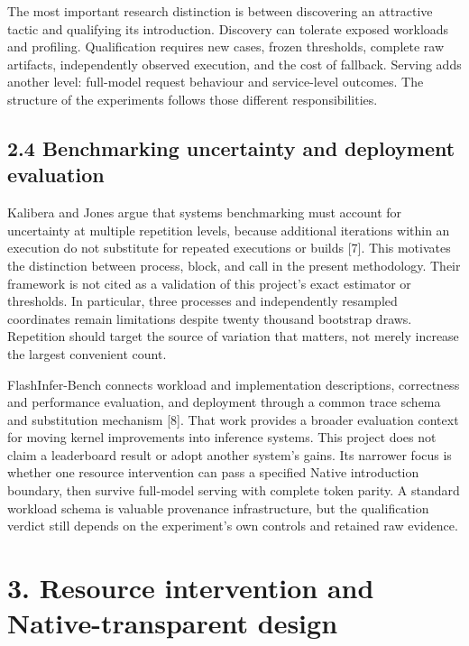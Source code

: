 \documentclass[11pt,a4paper]{article}
\begin{document}
The most important research distinction is between discovering an attractive tactic and qualifying its introduction. Discovery can tolerate exposed workloads and profiling. Qualification requires new cases, frozen thresholds, complete raw artifacts, independently observed execution, and the cost of fallback. Serving adds another level: full-model request behaviour and service-level outcomes. The structure of the experiments follows those different responsibilities.


\subsection*{2.4 Benchmarking uncertainty and deployment evaluation}

Kalibera and Jones argue that systems benchmarking must account for uncertainty at multiple repetition levels, because additional iterations within an execution do not substitute for repeated executions or builds [7]. This motivates the distinction between process, block, and call in the present methodology. Their framework is not cited as a validation of this project's exact estimator or thresholds. In particular, three processes and independently resampled coordinates remain limitations despite twenty thousand bootstrap draws. Repetition should target the source of variation that matters, not merely increase the largest convenient count.


FlashInfer-Bench connects workload and implementation descriptions, correctness and performance evaluation, and deployment through a common trace schema and substitution mechanism [8]. That work provides a broader evaluation context for moving kernel improvements into inference systems. This project does not claim a leaderboard result or adopt another system's gains. Its narrower focus is whether one resource intervention can pass a specified Native introduction boundary, then survive full-model serving with complete token parity. A standard workload schema is valuable provenance infrastructure, but the qualification verdict still depends on the experiment's own controls and retained raw evidence.


\clearpage

\section*{3. Resource intervention and Native-transparent design}

\end{document}
